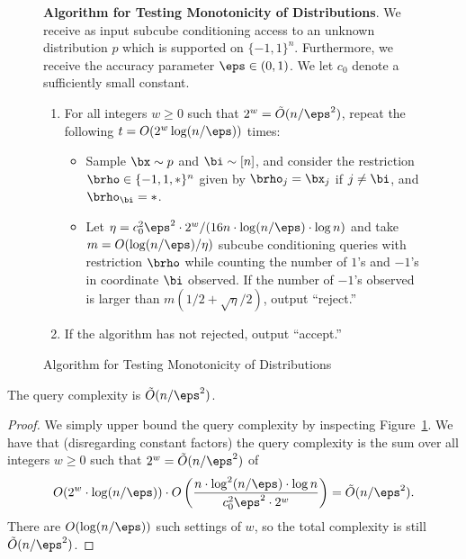\begin{figure}
\begin{framed}

\textbf{Algorithm for Testing Monotonicity of Distributions}. We receive as input subcube conditioning access to an unknown distribution $p$ which is supported on $\{-1,1\}^n$. Furthermore, we receive the accuracy parameter $\eps \in (0,1)$. We let $c_0$ denote a sufficiently small constant. 
\begin{enumerate}
    \item For all integers $w\geq0$ such that $2^w = \tilde{O}(n/\eps^2)$, repeat the following $t = O(2^{w} \log(n/\eps))$ times:
    \begin{itemize}
        \item Sample $\bx \sim p$ and $\bi \sim [n]$, and consider the restriction $\brho \in \{-1,1,*\}^n$ given by $\brho_j = \bx_j$ if $j \neq \bi$, and $\brho_{\bi} = *$. 
        \item Let $\eta = c_0^2\eps^2 \cdot 2^{w} / (16n \cdot \log(n/\eps) \cdot \log n)$ and take $m = O(\log (n/\eps)/\eta)$ subcube conditioning queries with restriction $\brho$ while counting the number of $1$'s and $-1$'s in coordinate $\bi$ observed. If the number of $-1$'s observed is larger than $m\left(1/2 + \sqrt{\eta}/2\right)$, output ``reject.''
    \end{itemize}
    \item If the algorithm has not rejected, output ``accept.''
\end{enumerate}

\end{framed}
\caption{Algorithm for Testing Monotonicity of Distributions} \label{fig:alg}
\end{figure}

\begin{claim}
    The query complexity is $\tilde{O}(n / \eps^2)$.
\end{claim}
\begin{proof}
    We simply upper bound the query complexity by inspecting Figure~\ref{fig:alg}. We have that (disregarding constant factors) the query complexity is the sum over all integers $w \geq 0$ such that $2^{w} = \tilde{O}(n/\eps^2)$ of 
    \[ O(2^{w} \cdot \log(n/\eps)) \cdot O\left(\dfrac{n\cdot \log^2(n/\eps) \cdot \log n}{c_0^2 \eps^2 \cdot 2^{w}} \right) = \tilde{O}(n / \eps^2). \]
    There are $O(\log(n/\eps))$ such settings of $w$, so the total complexity is still $\tilde{O}(n / \eps^2)$.
\end{proof}

